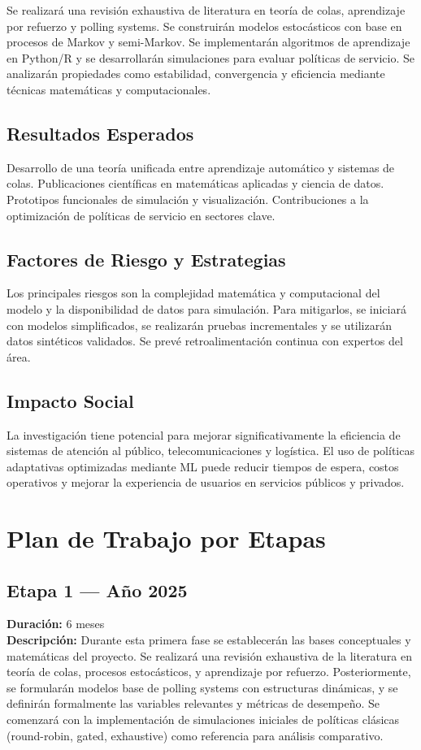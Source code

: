 \documentclass[12pt]{article}
\begin{document}
Se realizará una revisión exhaustiva de literatura en teoría de colas, aprendizaje por refuerzo y polling systems. Se construirán modelos estocásticos con base en procesos de Markov y semi-Markov. Se implementarán algoritmos de aprendizaje en Python/R y se desarrollarán simulaciones para evaluar políticas de servicio. Se analizarán propiedades como estabilidad, convergencia y eficiencia mediante técnicas matemáticas y computacionales.

\subsection*{Resultados Esperados}

Desarrollo de una teoría unificada entre aprendizaje automático y sistemas de colas. Publicaciones científicas en matemáticas aplicadas y ciencia de datos. Prototipos funcionales de simulación y visualización. Contribuciones a la optimización de políticas de servicio en sectores clave.

\subsection*{Factores de Riesgo y Estrategias}

Los principales riesgos son la complejidad matemática y computacional del modelo y la disponibilidad de datos para simulación. Para mitigarlos, se iniciará con modelos simplificados, se realizarán pruebas incrementales y se utilizarán datos sintéticos validados. Se prevé retroalimentación continua con expertos del área.

\subsection*{Impacto Social}

La investigación tiene potencial para mejorar significativamente la eficiencia de sistemas de atención al público, telecomunicaciones y logística. El uso de políticas adaptativas optimizadas mediante ML puede reducir tiempos de espera, costos operativos y mejorar la experiencia de usuarios en servicios públicos y privados.

\section{Plan de Trabajo por Etapas}

\subsection*{Etapa 1 — Año 2025}
\textbf{Duración:} 6 meses\\
\textbf{Descripción:} Durante esta primera fase se establecerán las bases conceptuales y matemáticas del proyecto. Se realizará una revisión exhaustiva de la literatura en teoría de colas, procesos estocásticos, y aprendizaje por refuerzo. Posteriormente, se formularán modelos base de polling systems con estructuras dinámicas, y se definirán formalmente las variables relevantes y métricas de desempeño. Se comenzará con la implementación de simulaciones iniciales de políticas clásicas (round-robin, gated, exhaustive) como referencia para análisis comparativo.
\end{document}
